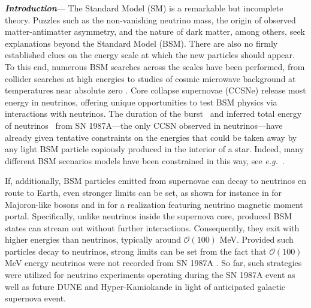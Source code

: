 
\textbf{\textit{Introduction}}---
The Standard Model (SM) is a remarkable but incomplete theory. Puzzles such as the non-vanishing neutrino mass, the origin of observed matter-antimatter asymmetry, and the nature of dark matter, among others, seek explanations beyond the Standard Model (BSM). There are also no firmly established clues on the energy scale at which the new particles should appear. To this end, numerous BSM searches across the scales have been performed, from collider searches at high energies \cite{Nath:2010zj} to studies of cosmic microwave background at temperatures near absolute zero \cite{Baumann:2015rya}. Core collapse supernovae (CCSNe) release most energy in neutrinos, offering unique opportunities to test BSM physics via interactions with neutrinos.
The duration of the burst~\cite{Kamiokande-II:1987idp,Bionta:1987qt,Baksan} and inferred total energy of neutrinos~\cite{Loredo:2001rx,Pagliaroli:2008ur,Huedepohl2010} from SN 1987A---the only CCSN observed in neutrinos---have already given tentative constraints on the energies that could be taken away by any light BSM particle copiously produced in the interior of a star.
Indeed, many different BSM scenarios models have been constrained in this way, see \textit{e.g.}~\cite{Raffelt:2011nc,Arguelles:2016uwb,Suliga:2020vpz,Lucente:2021hbp,Caputo:2022rca,Caputo:2021rux,PhysRevD.100.083002,DeRocco:2019njg,Kazanas:2014mca,Magill:2018jla}.


If, additionally, BSM particles emitted from supernovae can decay to neutrinos en route to Earth, even stronger limits can be set, as shown for instance in \cite{Fiorillo:2022cdq} for Majoron-like bosons and in \cite{Brdar:2023tmi} for a realization featuring neutrino magnetic moment portal. Specifically, unlike neutrinos inside the supernova core, produced BSM states can stream out without further interactions. Consequently, they exit with higher energies than neutrinos, typically around $\mathcal{O}(100)$ MeV. Provided such particles decay to neutrinos, strong limits can be set from the fact that $\mathcal{O}(100)$ MeV energy neutrinos were not recorded from SN 1987A \cite{Fiorillo:2022cdq, Brdar:2023tmi}. So far, such strategies were utilized for neutrino experiments operating during the SN 1987A event as well as future DUNE \cite{DUNE:2015lol} and Hyper-Kamiokande \cite{Hyper-Kamiokande:2018ofw} in light of anticipated galactic supernova event. 

